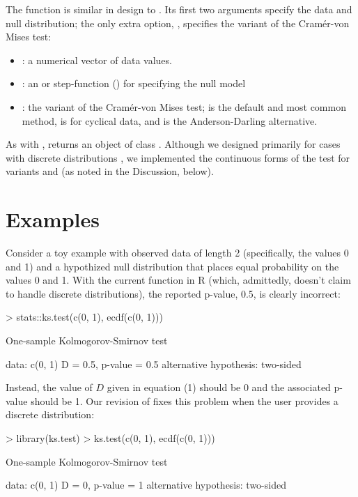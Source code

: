 The function  is similar in design
to .  Its first two
arguments specify the data and null distribution; the only extra option,
, specifies the variant of the Cram\'{e}r-von Mises test:
\begin{itemize}
\item {}: a numerical vector of data values.
\item {}: an  or step-function () for specifying
the null model
\item {}: the variant of the Cram\'{e}r-von Mises test; 
is the default and most common method,  is for cyclical data,
and  is the Anderson-Darling alternative.
\end{itemize}
As with ,  returns an object of class 
.  Although we designed  primarily for cases with
discrete distributions , we implemented the continuous forms of the
test for variants  and  (as noted in the Discussion, below).

 
\section{Examples}

Consider a toy example with observed data of length 2 (specifically, the
values 0 and 1) and a hypothized null distribution that places equal
probability on the values 0 and 1.  With the current  function
in R (which, admittedly, doesn't claim to handle discrete distributions),
the reported p-value, 0.5, is clearly incorrect:
\begin{Schunk}
\begin{Sinput}
> stats::ks.test(c(0, 1), ecdf(c(0, 1)))
\end{Sinput}
\begin{Soutput}
	One-sample Kolmogorov-Smirnov test

data:  c(0, 1) 
D = 0.5, p-value = 0.5
alternative hypothesis: two-sided 
\end{Soutput}
\end{Schunk}
Instead, the value of $D$ given in equation (1)
should be 0 and the associated p-value should be 1.  Our revision of 
fixes this problem when the user provides a discrete distribution:
\begin{Schunk} 
\begin{Sinput}
> library(ks.test)
> ks.test(c(0, 1), ecdf(c(0, 1)))
\end{Sinput}
\begin{Soutput}
	One-sample Kolmogorov-Smirnov test

data:  c(0, 1) 
D = 0, p-value = 1
alternative hypothesis: two-sided 
\end{Soutput}
\end{Schunk}

